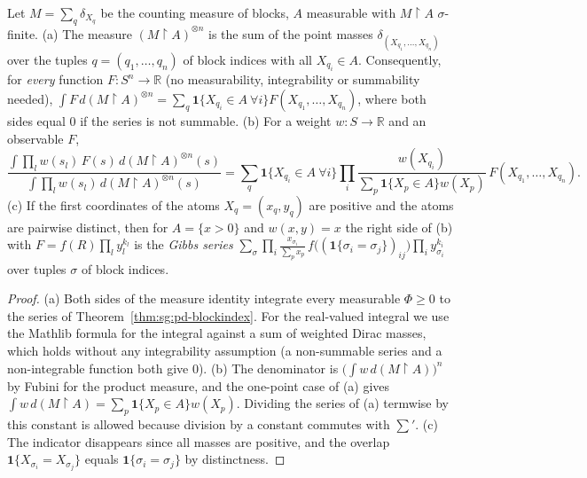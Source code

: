 \begin{theorem}\label{thm:sg:pd-gibbs-bridge}
  \leanok
{}
Let $M=\sum_q\delta_{X_q}$ be the counting measure of blocks, $A$ measurable with $M\!\restriction\!A$ $\sigma$-finite. (a) The measure $(M\!\restriction\!A)^{\otimes n}$ is the sum of the point masses $\delta_{(X_{q_1},\dots,X_{q_n})}$ over the tuples $q=(q_1,\dots,q_n)$ of block indices with all $X_{q_i}\in A$. Consequently, for \emph{every} function $F:S^n\to\mathbb R$ (no measurability, integrability or summability needed),
$\int F\,d(M\!\restriction\!A)^{\otimes n}=\sum_{q}\mathbf 1\{X_{q_i}\in A\ \forall i\}F(X_{q_1},\dots,X_{q_n})$, where both sides equal $0$ if the series is not summable. (b) For a weight $w:S\to\mathbb R$ and an observable $F$,
\[\frac{\int\prod_lw(s_l)\,F(s)\,d(M\!\restriction\!A)^{\otimes n}(s)}{\int\prod_lw(s_l)\,d(M\!\restriction\!A)^{\otimes n}(s)}=\sum_{q}\mathbf 1\{X_{q_i}\in A\ \forall i\}\prod_{i}\frac{w(X_{q_i})}{\sum_{p}\mathbf 1\{X_p\in A\}w(X_p)}\,F(X_{q_1},\dots,X_{q_n}).\]
(c) If the first coordinates of the atoms $X_q=(x_q,y_q)$ are positive and the atoms are pairwise distinct, then for $A=\{x>0\}$ and $w(x,y)=x$ the right side of (b) with $F=f(R)\prod_ly_l^{k_l}$ is the \emph{Gibbs series} $\sum_{\sigma}\prod_i\frac{x_{\sigma_i}}{\sum_px_p}\,f\big((\mathbf 1\{\sigma_i=\sigma_j\})_{ij}\big)\prod_iy_{\sigma_i}^{k_i}$ over tuples $\sigma$ of block indices.
\end{theorem}

\begin{proof}
  \leanok
(a) Both sides of the measure identity integrate every measurable $\Phi\ge0$ to the series of Theorem~\ref{thm:sg:pd-blockindex}. For the real-valued integral we use the Mathlib formula for the integral against a sum of weighted Dirac masses, which holds without any integrability assumption (a non-summable series and a non-integrable function both give $0$). (b) The denominator is $\big(\int w\,d(M\!\restriction\!A)\big)^n$ by Fubini for the product measure, and the one-point case of (a) gives $\int w\,d(M\!\restriction\!A)=\sum_p\mathbf 1\{X_p\in A\}w(X_p)$. Dividing the series of (a) termwise by this constant is allowed because division by a constant commutes with $\sum'$. (c) The indicator disappears since all masses are positive, and the overlap $\mathbf 1\{X_{\sigma_i}=X_{\sigma_j}\}$ equals $\mathbf 1\{\sigma_i=\sigma_j\}$ by distinctness.
\end{proof}

